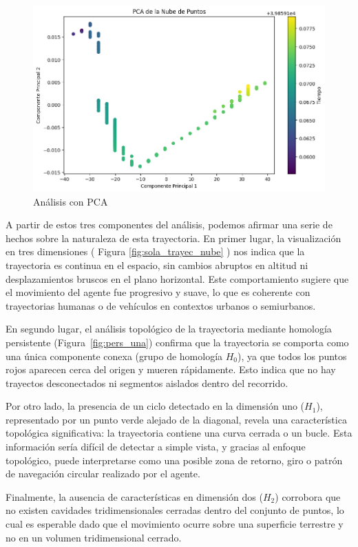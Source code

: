 \begin{figure}[htbp]
    \centering
    \includegraphics[width=0.75\linewidth]{images/pca_una.png}
    \caption{Análisis con PCA}
    \label{fig:enter-label}
\end{figure}

A partir de estos tres componentes del análisis, podemos afirmar una serie de hechos sobre la naturaleza de esta trayectoria. En primer lugar, 
la visualización en tres dimensiones ( Figura \ref{fig:sola_trayec_nube} ) nos indica que la trayectoria es continua en el espacio, sin cambios abruptos en altitud ni desplazamientos bruscos en el plano horizontal. Este comportamiento sugiere que el movimiento del agente fue progresivo y suave, lo que es coherente con trayectorias humanas o de vehículos en contextos urbanos o semiurbanos.

En segundo lugar, el análisis topológico de la trayectoria mediante homología persistente (Figura~\ref{fig:pers_una}) confirma que la trayectoria se comporta como una única componente conexa (grupo de homología \(H_0\)), ya que todos los puntos rojos aparecen cerca del origen y mueren rápidamente. Esto indica que no hay trayectos desconectados ni segmentos aislados dentro del recorrido.

Por otro lado, la presencia de un ciclo detectado en la dimensión uno (\(H_1\)), representado por un punto verde alejado de la diagonal, revela una característica topológica significativa: la trayectoria contiene una curva cerrada o un bucle. Esta información sería difícil de detectar a simple vista, y gracias al enfoque topológico, puede interpretarse como una posible zona de retorno, giro o patrón de navegación circular realizado por el agente.

Finalmente, la ausencia de características en dimensión dos (\(H_2\)) corrobora que no existen cavidades tridimensionales cerradas dentro del conjunto de puntos, lo cual es esperable dado que el movimiento ocurre sobre una superficie terrestre y no en un volumen tridimensional cerrado.

